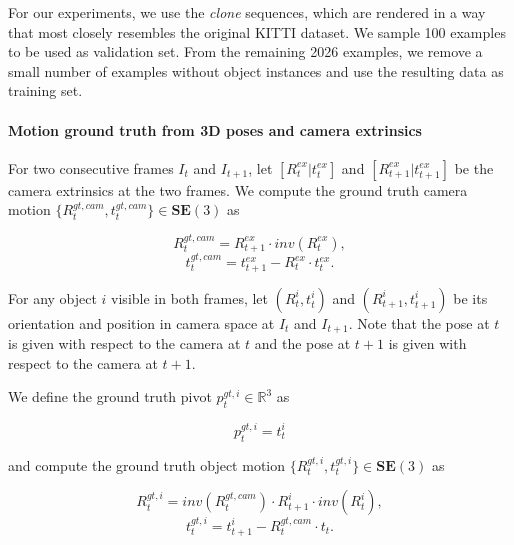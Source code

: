 For our experiments, we use the \emph{clone} sequences, which are rendered in a
way that most closely resembles the original KITTI dataset. We sample 100 examples
to be used as validation set. From the remaining 2026 examples,
we remove a small number of examples without object instances and use the resulting
data as training set.

\paragraph{Motion ground truth from 3D poses and camera extrinsics}
For two consecutive frames $I_t$ and $I_{t+1}$,
let $[R_t^{ex}|t_t^{ex}]$
and $[R_{t+1}^{ex}|t_{t+1}^{ex}]$
be the camera extrinsics at the two frames.
We compute the ground truth camera motion
$\{R_t^{gt, cam}, t_t^{gt, cam}\} \in \mathbf{SE}(3)$ as

\begin{equation}
R_{t}^{gt, cam} = R_{t+1}^{ex}  \cdot inv(R_t^{ex}),
\end{equation}
\begin{equation}
t_{t}^{gt, cam} = t_{t+1}^{ex}  - R_{t}^{ex} \cdot t_t^{ex}.
\end{equation}

For any object $i$ visible in both frames, let
$(R_t^i, t_t^i)$ and $(R_{t+1}^i, t_{t+1}^i)$
be its orientation and position in camera space
at $I_t$ and $I_{t+1}$.
Note that the pose at $t$ is given with respect to the camera at $t$ and
the pose at $t+1$ is given with respect to the camera at $t+1$.

We define the ground truth pivot $p_{t}^{gt, i} \in \mathbb{R}^3$ as

\begin{equation}
p_{t}^{gt, i} = t_t^i
\end{equation}

and compute the ground truth object motion
$\{R_t^{gt, i}, t_t^{gt, i}\} \in \mathbf{SE}(3)$ as

\begin{equation}
R_{t}^{gt, i} = inv(R_t^{gt, cam}) \cdot R_{t+1}^i \cdot inv(R_t^i),
\end{equation}
\begin{equation}
t_{t}^{gt, i} = t_{t+1}^{i}  - R_t^{gt, cam} \cdot t_t.
\end{equation}

